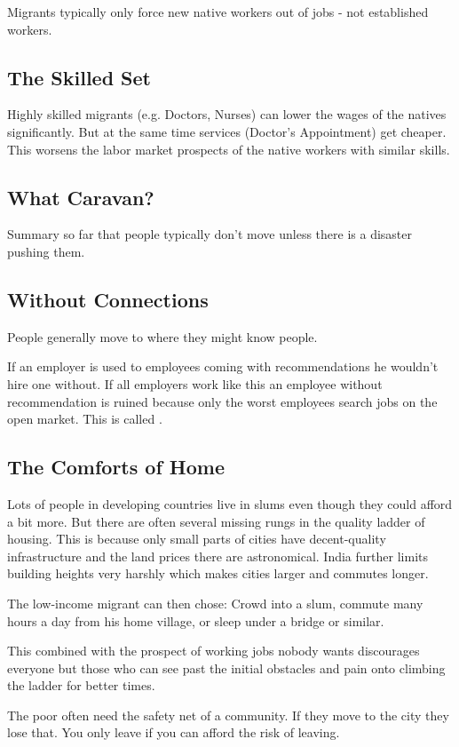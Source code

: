 \documentclass[a4paper, twocolumn]{article}
\newcommand{\keyword}[1]{\textbf{\color{black}{#1}}}
\begin{document}
Migrants typically only force new native workers out of jobs - not established workers.

\subsection{The Skilled Set}
Highly skilled migrants (e.g. Doctors, Nurses) can lower the wages of the natives significantly. But at the same time services (Doctor's Appointment) get cheaper. This worsens the labor market prospects of the native workers with similar skills.

\subsection{What Caravan?}
Summary so far that people typically don't move unless there is a disaster pushing them.

\subsection{Without Connections}
People generally move to where they might know people.

If an employer is used to employees coming with recommendations he wouldn't hire one without. If all employers work like this an employee without recommendation is ruined because only the worst employees search jobs on the open market. This is called \keyword{adverse selection}.

\subsection{The Comforts of Home}
Lots of people in developing countries live in slums even though they could afford a bit more. But there are often several missing rungs in the quality ladder of housing. This is because only small parts of cities have decent-quality infrastructure and the land prices there are astronomical. India further limits building heights very harshly which makes cities larger and commutes longer.

The low-income migrant can then chose: Crowd into a slum, commute many hours a day from his home village, or sleep under a bridge or similar.

This combined with the prospect of working jobs nobody wants discourages everyone but those who can see past the initial obstacles and pain onto climbing the ladder for better times.

The poor often need the safety net of a community. If they move to the city they lose that. You only leave if you can afford the risk of leaving.
\end{document}
